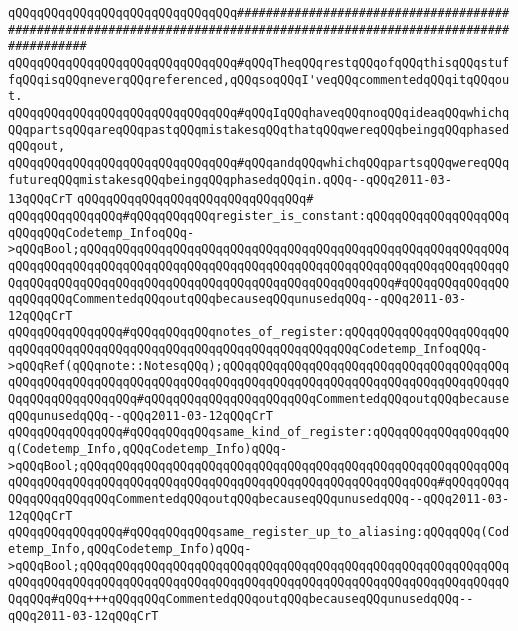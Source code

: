 \newline
\newline
\verb|qQQqqQQqqQQqqQQqqQQqqQQqqQQqqQQq#######################################################################################################################|\newline
\verb|qQQqqQQqqQQqqQQqqQQqqQQqqQQqqQQq#qQQqTheqQQqrestqQQqofqQQqthisqQQqstuffqQQqisqQQqneverqQQqreferenced,qQQqsoqQQqI'veqQQqcommentedqQQqitqQQqout.|\newline
\verb|qQQqqQQqqQQqqQQqqQQqqQQqqQQqqQQq#qQQqIqQQqhaveqQQqnoqQQqideaqQQqwhichqQQqpartsqQQqareqQQqpastqQQqmistakesqQQqthatqQQqwereqQQqbeingqQQqphasedqQQqout,|\newline
\verb|qQQqqQQqqQQqqQQqqQQqqQQqqQQqqQQq#qQQqandqQQqwhichqQQqpartsqQQqwereqQQqfutureqQQqmistakesqQQqbeingqQQqphasedqQQqin.qQQq--qQQq2011-03-13qQQqCrT|\newline
\verb|qQQqqQQqqQQqqQQqqQQqqQQqqQQqqQQq#|\newline
\verb|qQQqqQQqqQQqqQQq#qQQqqQQqqQQqregister_is_constant:qQQqqQQqqQQqqQQqqQQqqQQqqQQqCodetemp_InfoqQQq->qQQqBool;qQQqqQQqqQQqqQQqqQQqqQQqqQQqqQQqqQQqqQQqqQQqqQQqqQQqqQQqqQQqqQQqqQQqqQQqqQQqqQQqqQQqqQQqqQQqqQQqqQQqqQQqqQQqqQQqqQQqqQQqqQQqqQQqqQQqqQQqqQQqqQQqqQQqqQQqqQQqqQQqqQQqqQQqqQQqqQQqqQQqqQQq#qQQqqQQqqQQqqQQqqQQqqQQqCommentedqQQqoutqQQqbecauseqQQqunusedqQQq--qQQq2011-03-12qQQqCrT|\newline
\verb|qQQqqQQqqQQqqQQq#qQQqqQQqqQQqnotes_of_register:qQQqqQQqqQQqqQQqqQQqqQQqqQQqqQQqqQQqqQQqqQQqqQQqqQQqqQQqqQQqqQQqqQQqqQQqCodetemp_InfoqQQq->qQQqRef(qQQqnote::NotesqQQq);qQQqqQQqqQQqqQQqqQQqqQQqqQQqqQQqqQQqqQQqqQQqqQQqqQQqqQQqqQQqqQQqqQQqqQQqqQQqqQQqqQQqqQQqqQQqqQQqqQQqqQQqqQQqqQQqqQQqqQQqqQQqqQQq#qQQqqQQqqQQqqQQqqQQqqQQqCommentedqQQqoutqQQqbecauseqQQqunusedqQQq--qQQq2011-03-12qQQqCrT|\newline
\verb|qQQqqQQqqQQqqQQq#qQQqqQQqqQQqsame_kind_of_register:qQQqqQQqqQQqqQQqqQQq(Codetemp_Info,qQQqCodetemp_Info)qQQq->qQQqBool;qQQqqQQqqQQqqQQqqQQqqQQqqQQqqQQqqQQqqQQqqQQqqQQqqQQqqQQqqQQqqQQqqQQqqQQqqQQqqQQqqQQqqQQqqQQqqQQqqQQqqQQqqQQqqQQqqQQqqQQq#qQQqqQQqqQQqqQQqqQQqqQQqCommentedqQQqoutqQQqbecauseqQQqunusedqQQq--qQQq2011-03-12qQQqCrT|\newline
\verb|qQQqqQQqqQQqqQQq#qQQqqQQqqQQqsame_register_up_to_aliasing:qQQqqQQq(Codetemp_Info,qQQqCodetemp_Info)qQQq->qQQqBool;qQQqqQQqqQQqqQQqqQQqqQQqqQQqqQQqqQQqqQQqqQQqqQQqqQQqqQQqqQQqqQQqqQQqqQQqqQQqqQQqqQQqqQQqqQQqqQQqqQQqqQQqqQQqqQQqqQQqqQQqqQQqqQQqqQQqqQQq#qQQq+++qQQqqQQqCommentedqQQqoutqQQqbecauseqQQqunusedqQQq--qQQq2011-03-12qQQqCrT|\newline
